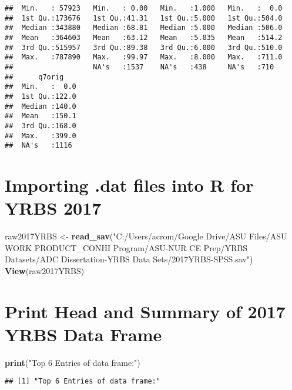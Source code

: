 \documentclass[
]{article}
\newenvironment{Shaded}{\begin{snugshade}}{\end{snugshade}}
\newcommand{\FunctionTok}[1]{\textcolor[rgb]{0.13,0.29,0.53}{\textbf{#1}}}
\newcommand{\NormalTok}[1]{#1}
\newcommand{\OtherTok}[1]{\textcolor[rgb]{0.56,0.35,0.01}{#1}}
\newcommand{\StringTok}[1]{\textcolor[rgb]{0.31,0.60,0.02}{#1}}
\begin{document}
\begin{verbatim}
##  Min.   : 57923   Min.   : 0.00   Min.   :1.000   Min.   :  0.0  
##  1st Qu.:173676   1st Qu.:41.31   1st Qu.:5.000   1st Qu.:504.0  
##  Median :343880   Median :68.81   Median :5.000   Median :506.0  
##  Mean   :364603   Mean   :63.12   Mean   :5.035   Mean   :514.2  
##  3rd Qu.:515957   3rd Qu.:89.38   3rd Qu.:6.000   3rd Qu.:510.0  
##  Max.   :787890   Max.   :99.97   Max.   :8.000   Max.   :711.0  
##                   NA's   :1537    NA's   :438     NA's   :710    
##      q7orig     
##  Min.   :  0.0  
##  1st Qu.:122.0  
##  Median :140.0  
##  Mean   :150.1  
##  3rd Qu.:168.0  
##  Max.   :399.0  
##  NA's   :1116
\end{verbatim}

\hypertarget{importing-.dat-files-into-r-for-yrbs-2017}{%
\section{Importing .dat files into R for YRBS
2017}\label{importing-.dat-files-into-r-for-yrbs-2017}}

\begin{Shaded}
\begin{Highlighting}[]
\NormalTok{raw2017YRBS }\OtherTok{\textless{}{-}} \FunctionTok{read\_sav}\NormalTok{(}\StringTok{"C:/Users/acrom/Google Drive/ASU Files/ASU WORK PRODUCT\_CONHI Program/ASU{-}NUR CE Prep/YRBS Datasets/ADC Dissertation{-}YRBS Data Sets/2017YRBS{-}SPSS.sav"}\NormalTok{)}
\FunctionTok{View}\NormalTok{(raw2017YRBS)}
\end{Highlighting}
\end{Shaded}

\hypertarget{print-head-and-summary-of-2017-yrbs-data-frame}{%
\section{Print Head and Summary of 2017 YRBS Data
Frame}\label{print-head-and-summary-of-2017-yrbs-data-frame}}

\begin{Shaded}
\begin{Highlighting}[]
\FunctionTok{print}\NormalTok{(}\StringTok{"Top 6 Entries of data frame:"}\NormalTok{)}
\end{Highlighting}
\end{Shaded}

\begin{verbatim}
## [1] "Top 6 Entries of data frame:"
\end{verbatim}
\end{document}
